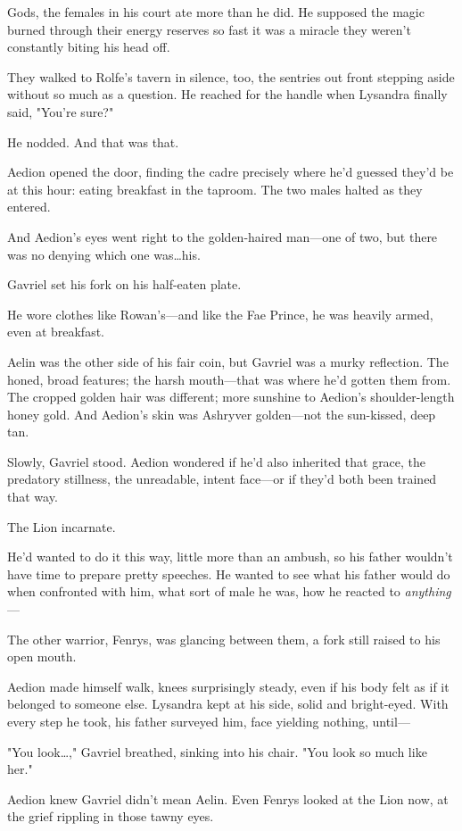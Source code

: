 Gods, the females in his court ate more than he did.
He supposed the magic burned through their energy reserves so fast it was a miracle they weren't constantly biting his head off.

They walked to Rolfe's tavern in silence, too, the sentries out front stepping aside without so much as a question.
He reached for the handle when Lysandra finally said, "You're sure?"

He nodded.
And that was that.

Aedion opened the door, finding the cadre precisely where he'd guessed they'd be at this hour: eating breakfast in the taproom.
The two males halted as they entered.

And Aedion's eyes went right to the golden-haired man---one of two, but  there was no denying which one was\ldots his.

Gavriel set his fork on his half-eaten plate.

He wore clothes like Rowan's---and like the Fae Prince, he was heavily armed, even at breakfast.

Aelin was the other side of his fair coin, but Gavriel was a murky reflection.
The honed, broad features; the harsh mouth---that was where he'd gotten them from.
The cropped golden hair was different; more sunshine to Aedion's shoulder-length honey gold.
And Aedion's skin was Ashryver golden---not the sun-kissed, deep tan.

Slowly, Gavriel stood.
Aedion wondered if he'd also inherited that grace, the predatory stillness, the unreadable, intent face---or if they'd both been trained that way.

The Lion incarnate.

He'd wanted to do it this way, little more than an ambush, so his father wouldn't have time to prepare pretty speeches.
He wanted to see what his father would do when confronted with him, what sort of male he was, how he reacted to \emph{anything}---

The other warrior, Fenrys, was glancing between them, a fork still raised to his open mouth.

Aedion made himself walk, knees surprisingly steady, even if his body felt as if it belonged to someone else.
Lysandra kept at his side, solid and bright-eyed.
With every step he took, his father surveyed him, face yielding nothing, until---

"You look\ldots ," Gavriel breathed, sinking into his chair.
"You look so much like her."

Aedion knew Gavriel didn't mean Aelin.
Even Fenrys looked at the Lion now, at the grief rippling in those tawny eyes.

